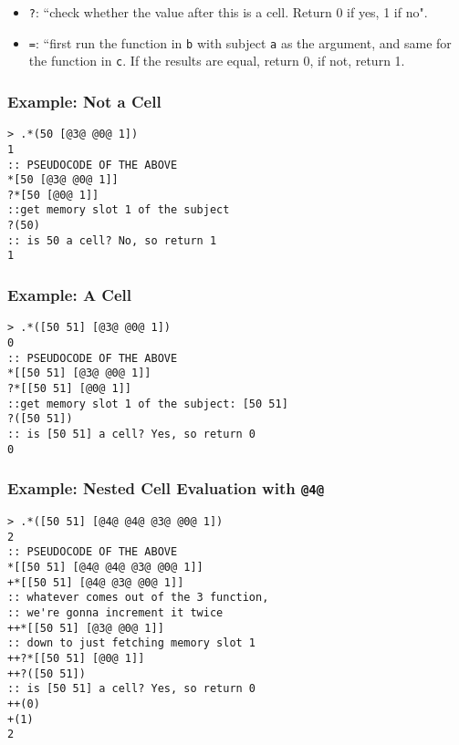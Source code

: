 \documentclass[twoside]{article}
\begin{document}
\begin{itemize}
  \item  \lstinline[style=inlinecode]{?}: ``check whether the value after this is a cell. Return 0 if yes, 1 if no".
  \item  \lstinline[style=inlinecode]{=}: ``first run the function in \lstinline[style=inlinecode]{b} with subject \lstinline[style=inlinecode]{a} as the argument, and same for the function in \lstinline[style=inlinecode]{c}. If the results are equal, return 0, if not, return 1.
\end{itemize}


\subsubsection{Example:  Not a Cell}

\begin{lstlisting}[style=listingcode]
> .*(50 [@3@ @0@ 1])
1
:: PSEUDOCODE OF THE ABOVE
*[50 [@3@ @0@ 1]]
?*[50 [@0@ 1]]
::get memory slot 1 of the subject
?(50)
:: is 50 a cell? No, so return 1
1
\end{lstlisting}

\subsubsection{Example:  A Cell}

\begin{lstlisting}[style=listingcode]
> .*([50 51] [@3@ @0@ 1])
0
:: PSEUDOCODE OF THE ABOVE
*[[50 51] [@3@ @0@ 1]]
?*[[50 51] [@0@ 1]]
::get memory slot 1 of the subject: [50 51]
?([50 51])
:: is [50 51] a cell? Yes, so return 0
0
\end{lstlisting}

\subsubsection{Example:  Nested Cell Evaluation with \lstinline[style=inlinecode]{@4@}}

\begin{lstlisting}[style=listingcode]
> .*([50 51] [@4@ @4@ @3@ @0@ 1])
2
:: PSEUDOCODE OF THE ABOVE
*[[50 51] [@4@ @4@ @3@ @0@ 1]]
+*[[50 51] [@4@ @3@ @0@ 1]]
:: whatever comes out of the 3 function,
:: we're gonna increment it twice
++*[[50 51] [@3@ @0@ 1]]
:: down to just fetching memory slot 1
++?*[[50 51] [@0@ 1]]
++?([50 51])
:: is [50 51] a cell? Yes, so return 0
++(0)
+(1)
2
\end{lstlisting}
\end{document}
